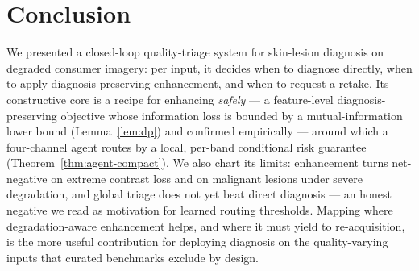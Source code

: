 \section{Conclusion}\label{sec:conclusion}
We presented a closed-loop quality-triage system for skin-lesion diagnosis on degraded consumer
imagery: per input, it decides when to diagnose directly, when to apply diagnosis-preserving
enhancement, and when to request a retake. Its constructive core is a recipe for enhancing
\emph{safely} --- a feature-level diagnosis-preserving objective whose information loss is bounded by a
mutual-information lower bound (Lemma~\ref{lem:dp}) and confirmed empirically --- around which a
four-channel agent routes by a local, per-band conditional risk guarantee
(Theorem~\ref{thm:agent-compact}). We also chart its limits: enhancement turns net-negative on
extreme contrast loss and on malignant lesions under severe degradation, and global triage does not
yet beat direct diagnosis --- an honest negative we read as motivation for learned routing thresholds.
Mapping where degradation-aware enhancement helps, and where it must yield to re-acquisition, is the
more useful contribution for deploying diagnosis on the quality-varying inputs that curated benchmarks
exclude by design.
